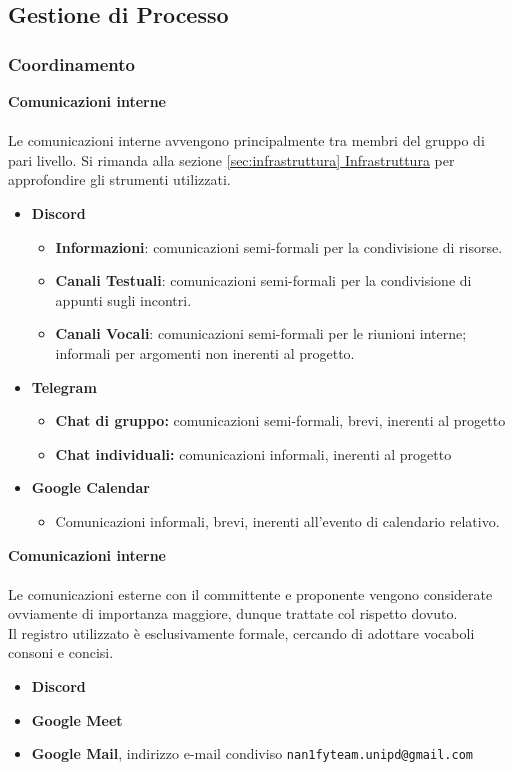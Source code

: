 \subsection{Gestione di Processo}
\subsubsection{Coordinamento}
\textbf{Comunicazioni interne}\\\\
Le comunicazioni interne avvengono principalmente tra membri del gruppo di pari livello. Si rimanda alla sezione \hyperref[sec:infrastruttura]{\ref{sec:infrastruttura} Infrastruttura} per approfondire gli strumenti utilizzati.
\begin{itemize}
  \item{\textbf{Discord}}
  \begin{itemize}
    \item \textbf{Informazioni}: comunicazioni semi-formali per la condivisione di risorse.
    \item \textbf{Canali Testuali}: comunicazioni semi-formali per la condivisione di appunti sugli incontri.
    \item \textbf{Canali Vocali}: comunicazioni semi-formali per le riunioni interne; informali per argomenti non inerenti al progetto.
  \end{itemize}
  \item{\textbf{Telegram}}
  \begin{itemize}
    \item{\textbf{Chat di gruppo:} comunicazioni semi-formali, brevi, inerenti al progetto}
    \item{\textbf{Chat individuali:} comunicazioni informali, inerenti al progetto}
  \end{itemize}
  \item{\textbf{Google Calendar}}
  \begin{itemize}
    \item{Comunicazioni informali, brevi, inerenti all'evento di calendario relativo.}
  \end{itemize}
\end{itemize}
\textbf{Comunicazioni interne}
\\\\
Le comunicazioni esterne con il committente e proponente vengono considerate ovviamente di importanza maggiore, dunque trattate col rispetto dovuto.\\
Il registro utilizzato è esclusivamente formale, cercando di adottare vocaboli consoni e concisi.
\begin{itemize}
  \item{\textbf{Discord}}
  \item{\textbf{Google Meet}}
  \item{\textbf{Google Mail}, indirizzo e-mail condiviso \texttt{nan1fyteam.unipd@gmail.com}}
\end{itemize}
